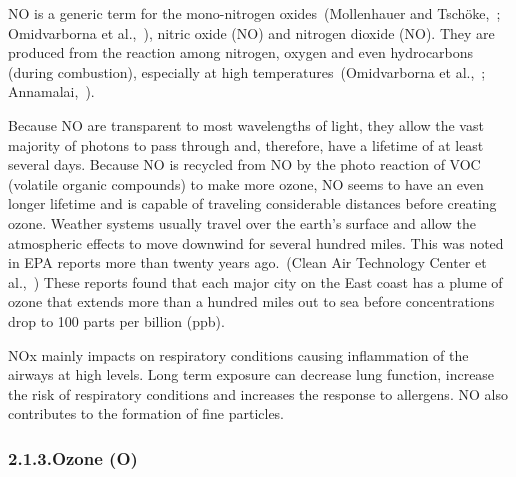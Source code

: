 \documentclass[9pt]{report}
\begin{document}
\noindent{}NO is a generic term for the mono-nitrogen oxides~(Mollenhauer and Tschöke,~; Omidvarborna et al.,~), nitric oxide (NO) and nitrogen dioxide (NO).
They are produced from the reaction among nitrogen, oxygen and even hydrocarbons (during combustion), especially at high temperatures~(Omidvarborna et al.,~; Annamalai,~).%

Because NO are transparent to most wavelengths of light, they allow the vast majority of photons to pass through and, therefore, have a lifetime of at least several days.
Because NO is  recycled from NO by the photo reaction of VOC (volatile organic compounds) to make more ozone, NO seems to have an even longer lifetime and is capable of traveling considerable distances before creating ozone.  Weather systems usually travel over the earth’s surface and allow the atmospheric effects to move downwind for several hundred miles.
This was noted in EPA reports more than twenty years ago.~(Clean Air Technology Center et al.,~)
These reports found that each major city on the East coast has a plume of ozone that extends more than a hundred miles out to sea before concentrations drop to 100 parts per billion (ppb).%

NOx mainly impacts on respiratory conditions causing inflammation of the airways at high levels. Long term exposure can decrease lung function, increase the risk of respiratory conditions and increases the response to allergens.
NO also contributes to the formation of fine particles.%

\subsubsection{2.1.3.\hspace*{0.5em}Ozone (O)}\label{sec-ozone-o3}%
\end{document}
